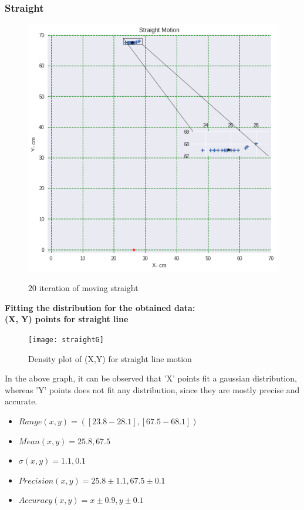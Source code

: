 \documentclass[11pt,a4paper]{article}
\begin{document}
\begin{itemize}
\subsubsection{Straight}
\begin{figure}[H]
\centering	
\includegraphics[width=1.2\linewidth]{Straight}
\label{fig:straight}
\caption{20 iteration of moving straight}
\end{figure}

\newpage
\textbf{Fitting the distribution for the obtained data: \\ (X, Y) points for straight line}
\begin{figure}[H]
\centering	
\texttt{[image: straightG]}
\label{fig:straightG}
\caption{Density plot of (X,Y) for straight line motion}
\end{figure}

In the above graph, it can be observed that 'X' points fit a gaussian distribution, whereas 'Y' points does not fit any distribution, since they are mostly precise and accurate.
\begin{itemize}
\item $ Range (x,y) =([23.8-28.1],[67.5-68.1]) $
\item $ Mean (x, y) = 25.8,67.5$
\item $ \sigma (x, y)= 1.1, 0.1 $
\item $ Precision (x, y)= 25.8 \pm 1.1, 67.5 \pm 0.1  $
\item $ Accuracy (x,y) = x \pm0.9  , y \pm0.1 $  
\end{itemize}


\end{itemize}
\end{document}
